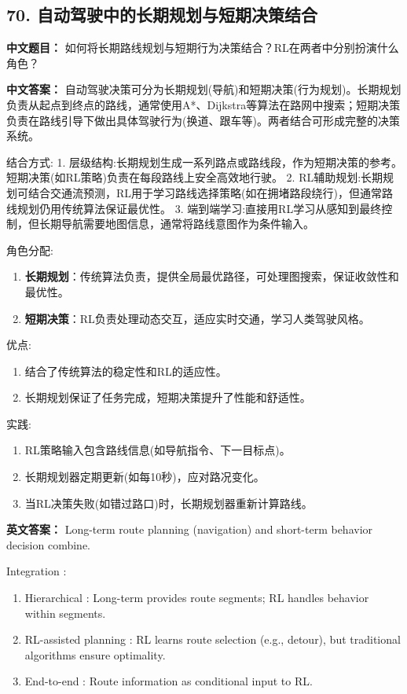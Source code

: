\documentclass[10pt,a4paper]{ctexart}
\begin{document}
\subsection*{70. 自动驾驶中的长期规划与短期决策结合}
\textbf{中文题目：} 如何将长期路线规划与短期行为决策结合？RL在两者中分别扮演什么角色？

\textbf{中文答案：}  
自动驾驶决策可分为长期规划(导航)和短期决策(行为规划)。长期规划负责从起点到终点的路线，通常使用A*、Dijkstra等算法在路网中搜索；短期决策负责在路线引导下做出具体驾驶行为(换道、跟车等)。两者结合可形成完整的决策系统。

 结合方式:
1.  层级结构:长期规划生成一系列路点或路线段，作为短期决策的参考。短期决策(如RL策略)负责在每段路线上安全高效地行驶。
2.  RL辅助规划:长期规划可结合交通流预测，RL用于学习路线选择策略(如在拥堵路段绕行)，但通常路线规划仍用传统算法保证最优性。
3.  端到端学习:直接用RL学习从感知到最终控制，但长期导航需要地图信息，通常将路线意图作为条件输入。

 角色分配:
\begin{enumerate}
    \item \textbf{长期规划}：传统算法负责，提供全局最优路径，可处理图搜索，保证收敛性和最优性。
    \item \textbf{短期决策}：RL负责处理动态交互，适应实时交通，学习人类驾驶风格。
\end{enumerate}

 优点:
\begin{enumerate}
    \item 结合了传统算法的稳定性和RL的适应性。
    \item 长期规划保证了任务完成，短期决策提升了性能和舒适性。
\end{enumerate}

 实践:
\begin{enumerate}
    \item RL策略输入包含路线信息(如导航指令、下一目标点)。
    \item 长期规划器定期更新(如每10秒)，应对路况变化。
    \item 当RL决策失败(如错过路口)时，长期规划器重新计算路线。
\end{enumerate}

\textbf{英文答案：}  
Long-term route planning (navigation) and short-term behavior decision combine.

 Integration :
\begin{enumerate}
    \item Hierarchical : Long-term provides route segments; RL handles behavior within segments.
    \item RL-assisted planning : RL learns route selection (e.g., detour), but traditional algorithms ensure optimality.
    \item End-to-end : Route information as conditional input to RL.
\end{enumerate}
\end{document}
